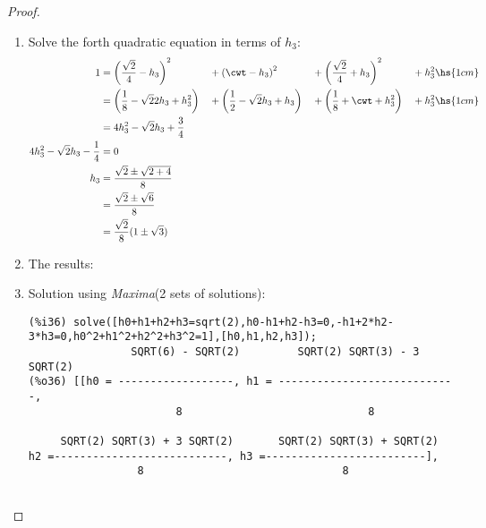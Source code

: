 \begin{proof}
\begin{enumerate}
\begin{enumerate}
\item Solve the forth quadratic equation in terms of $h_3$:
\begin{align*}
  1 
    &=  \left(\frac{\sqrt{2}}{4}-h_3\right)^2
    &&+ \left(\cwt -h_3\right)^2
    &&+ \left(\frac{\sqrt{2}}{4}+h_3\right)^2
    &&+ h_3^2 \hs{1cm}
  \\&=  \left(\frac{1}{8}-\sqrt{2}{2}h_3+h_3^2\right)
    &&+ \left(\frac{1}{2}-\sqrt{2}h_3+h_3\right)
    &&+ \left(\frac{1}{8}+\cwt +h_3^2\right)
    &&+ h_3^2 \hs{1cm}
  \\&=  4h_3^2 -\sqrt{2}h_3 + \frac{3}{4}
\\
  4h_3^2 -\sqrt{2}h_3 - \frac{1}{4} &=0
\\
  h_3 
    &= \frac{\sqrt{2}\pm\sqrt{2+4}}{8}
  \\&= \frac{\sqrt{2}\pm\sqrt{6}}{8}
  \\&= \frac{\sqrt{2}}{8}(1\pm\sqrt{3})
\end{align*}

\item The results:

\item Solution using {\em Maxima}\texttrademark \hspace{1ex}(2 sets of solutions): \\
{\scriptsize
\begin{verbatim}
(%i36) solve([h0+h1+h2+h3=sqrt(2),h0-h1+h2-h3=0,-h1+2*h2-3*h3=0,h0^2+h1^2+h2^2+h3^2=1],[h0,h1,h2,h3]);
                SQRT(6) - SQRT(2)         SQRT(2) SQRT(3) - 3 SQRT(2)
(%o36) [[h0 = ------------------, h1 = ----------------------------, 
                       8                             8

     SQRT(2) SQRT(3) + 3 SQRT(2)       SQRT(2) SQRT(3) + SQRT(2)
h2 =---------------------------, h3 =-------------------------], 
                 8                               8


\end{verbatim}}
\end{enumerate}
\end{enumerate}
\end{proof}
